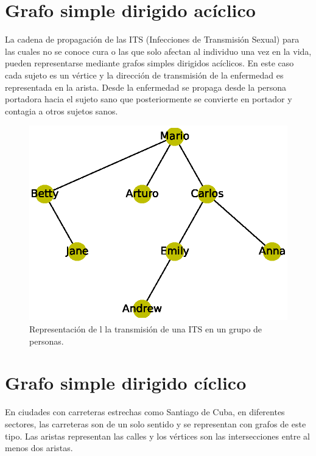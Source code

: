 \documentclass{article}
\begin{document}
\section{Grafo simple dirigido acíclico}

La cadena de propagación de las ITS (Infecciones de Transmisión Sexual) para las cuales no se conoce cura o las que solo afectan al individuo una vez en la vida, pueden representarse mediante grafos simples dirigidos acíclicos. En este caso cada sujeto es un vértice y la dirección de transmisión de la enfermedad es representada en la arista. Desde la enfermedad se propaga desde la persona portadora hacia el sujeto sano que posteriormente se convierte en portador y contagia a otros sujetos sanos.


\begin{figure}
  \includegraphics[width=.8\columnwidth]{4.eps}
  \caption{Representación de l la transmisión de una ITS en un grupo de personas.}
  \label{fig:4}
\end{figure}

\section{Grafo simple dirigido cíclico}

En ciudades con carreteras estrechas como Santiago de Cuba, en diferentes sectores, las carreteras son de un solo sentido y se representan con grafos de este tipo. Las aristas representan las calles y los vértices son las intersecciones entre al menos dos aristas.
\end{document}
